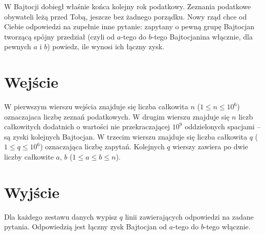 \documentclass{spiral-kurs}
\begin{document}
\makeheader
%
W Bajtocji dobiegł właśnie końca kolejny rok podatkowy. Zeznania podatkowe obywateli leżą przed Tobą, jeszcze bez żadnego porządku. Nowy rząd chce od Ciebie odpowiedzi na zupełnie inne pytanie: zapytany o pewną grupę Bajtocjan tworzącą spójny przedział (czyli od $a$-tego do $b$-tego Bajtocjanina włącznie, dla pewnych $a$ i $b$) powiedz, ile wynosi ich łączny zysk.

   \section{Wejście}
W pierwszym wierszu wejścia znajduje się liczba całkowita $n$ ($1 \le n \le 10^6$) oznaczajaca liczbę zeznań podatkowych.
W drugim wierszu znajduje się $n$ liczb całkowitych dodatnich o wartości nie przekraczającej $10^9$ oddzielonych spacjami -- są zyski kolejnych Bajtocjan.
W trzecim wierszu znajduje się liczba całkowita $q$ ($1 \le q \le 10^6$) oznaczająca liczbę zapytań. Kolejnych $q$ wierszy zawiera po dwie liczby całkowite $a$, $b$ ($1 \leq a \leq b \leq n$).


  \section{Wyjście}
Dla każdego zestawu danych wypisz $q$ linii zawierających odpowiedzi na zadane pytania.
Odpowiedzią jest łączny zysk Bajtocjan od $a$-tego do $b$-tego włącznie.



  
\end{document}
